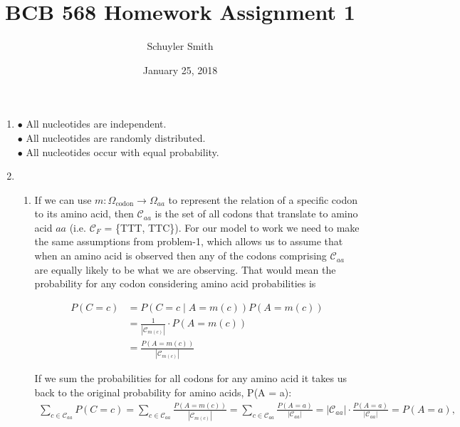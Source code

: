 \documentclass[12pt]{article}
\numberwithin{theorem}{subsection}
\theoremstyle{definition}
\numberwithin{definition}{subsection}
\numberwithin{corollary}{subsection}
\theoremstyle{remark}
\begin{document}
\setlength{\parindent}{0pt}
\title{BCB 568 Homework Assignment 1}
\author{Schuyler Smith}
\date{January 25, 2018}
 
\maketitle

\begin{enumerate}[label=\textbf{\arabic*.}]

    \item $\bullet$ All nucleotides are independent.\\
    $\bullet$ All nucleotides are randomly distributed.\\
    $\bullet$ All nucleotides occur with equal probability.
    
    \item 
        \begin{enumerate}[label = \textbf{\alph*.}]
            \item If we can use $m:\Omega_{\text{codon}} \to \Omega_{aa}$ to represent the relation of a specific codon to its amino acid, then $\mathcal{C}_{aa}$ is the set of all codons that translate to amino acid $aa$ (i.e. $\mathcal{C}_F$ = \{TTT, TTC\}). For our model to work we need to make the same assumptions from problem-1, which allows us to assume that when an amino acid is observed then any of the codons comprising $\mathcal{C}_{aa}$ are equally likely to be what we are observing. That would mean the probability for any codon considering amino acid probabilities is

                \begin{align*}
                    P(C = c)    &= P(C = c \mid A = m(c))P(A = m(c)) \\
                                &= \frac{1}{|\mathcal{C}_{m(c)}|}\cdot P(A = m(c)) \\
                                &=\frac{P(A = m(c))}{|\mathcal{C}_{m(c)}|}
                \end{align*}
                
            If we sum the probabilities for all codons for any amino acid it takes us back to the original probability for amino acids, P(A = a):
                \begin{align*}
                    \sum_{c \in \mathcal{C}_{aa}} P(C = c) = \sum_{c \in \mathcal{C}_{aa}} \frac{P(A = m(c))}{|\mathcal{C}_{m(c)}|} = \sum_{c \in \mathcal{C}_{aa}} \frac{P(A = a)}{|\mathcal{C}_{aa}|} = |\mathcal{C}_{aa}|\cdot\frac{P(A = a)}{|\mathcal{C}_{aa}|} = P(A = a), 
                \end{align*}


\end{enumerate}
\end{enumerate}
\end{document}
